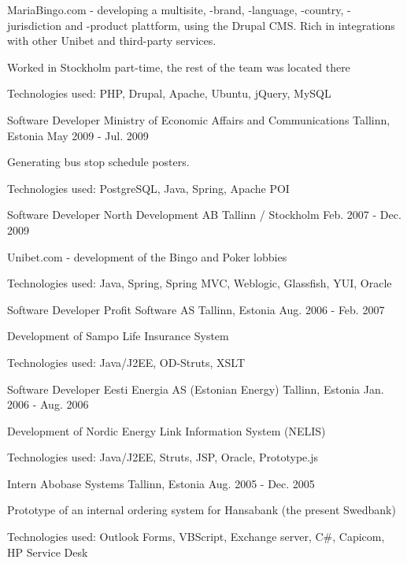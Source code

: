 \begin{cventries}
{\begin{cvitems}
        \item {MariaBingo.com - developing a multisite, -brand, -language, -country, -jurisdiction and -product plattform, using the Drupal CMS. Rich in integrations with other Unibet and third-party services.}
        \item {Worked in Stockholm part-time, the rest of the team was located there}
        \item { Technologies used: PHP, Drupal, Apache, Ubuntu, jQuery, MySQL }
      \end{cvitems}
    }
  \cventry
    {Software Developer}
    {Ministry of Economic Affairs and Communications}
    {Tallinn, Estonia}
    {May 2009 - Jul. 2009}
    {
      \begin{cvitems}
        \item { Generating bus stop schedule posters.}
        \item { Technologies used: PostgreSQL, Java, Spring, Apache POI }
      \end{cvitems}
    }
  \cventry
    {Software Developer}
    {North Development AB}
    {Tallinn / Stockholm}
    {Feb. 2007 - Dec. 2009}
    {
      \begin{cvitems}
        \item { Unibet.com - development of the Bingo and Poker lobbies}
        \item { Technologies used: Java, Spring, Spring MVC, Weblogic, Glassfish, YUI, Oracle }
      \end{cvitems}
    }
  \cventry
    {Software Developer}
    {Profit Software AS}
    {Tallinn, Estonia}
    {Aug. 2006 - Feb. 2007}
    {
      \begin{cvitems}
        \item { Development of Sampo Life Insurance System}
        \item { Technologies used: Java/J2EE, OD-Struts, XSLT }
      \end{cvitems}
    }
  \cventry
    {Software Developer}
    {Eesti Energia AS (Estonian Energy)}
    {Tallinn, Estonia}
    {Jan. 2006 - Aug. 2006}
    {
      \begin{cvitems}
        \item { Development of Nordic Energy Link Information System (NELIS)}
        \item { Technologies used: Java/J2EE, Struts, JSP, Oracle, Prototype.js }
      \end{cvitems}
    }
  \cventry
    {Intern}
    {Abobase Systems}
    {Tallinn, Estonia}
    {Aug. 2005 - Dec. 2005}
    {
      \begin{cvitems}
        \item { Prototype of an internal ordering system for Hansabank (the present Swedbank)}
        \item { Technologies used: Outlook Forms, VBScript, Exchange server, C#, Capicom, HP Service Desk }
      \end{cvitems}
    }
\end{cventries}
